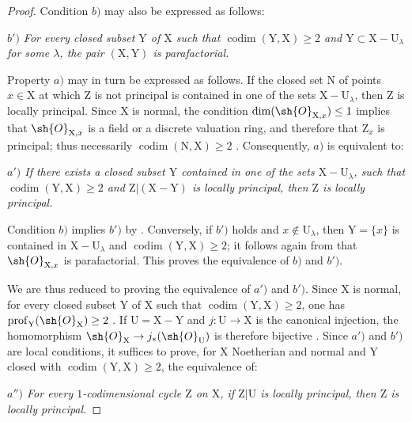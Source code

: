 \begin{proof}
Condition $b)$ may also be expressed as follows:

\emph{$b')$ For every closed subset $\mathrm{Y}$ of $\mathrm{X}$ such that $\operatorname{codim}(\mathrm{Y},\mathrm{X})\geq 2$ and $\mathrm{Y}\subset\mathrm{X}-\mathrm{U}_\lambda$ for some $\lambda$, the pair $(\mathrm{X},\mathrm{Y})$ is parafactorial.}

Property $a)$ may in turn be expressed as follows. If the closed set $\mathrm{N}$ of points $x\in\mathrm{X}$ at which $\mathrm{Z}$ is not principal is contained in one of the sets $\mathrm{X}-\mathrm{U}_\lambda$, then $\mathrm{Z}$ is locally principal. Since $\mathrm{X}$ is normal, the condition $\dim(\sh{O}_{\mathrm{X},x})\leq 1$ implies that $\sh{O}_{\mathrm{X},x}$ is a field or a discrete valuation ring, and therefore that $\mathrm{Z}_x$ is principal; thus necessarily $\operatorname{codim}(\mathrm{N},\mathrm{X})\geq 2$ . Consequently, $a)$ is equivalent to:

\emph{$a')$ If there exists a closed subset $\mathrm{Y}$ contained in one of the sets $\mathrm{X}-\mathrm{U}_\lambda$, such that $\operatorname{codim}(\mathrm{Y},\mathrm{X})\geq 2$ and $\mathrm{Z}|(\mathrm{X}-\mathrm{Y})$ is locally principal, then $\mathrm{Z}$ is locally principal.}

Condition $b)$ implies $b')$ by . Conversely, if $b')$ holds and $x\notin\mathrm{U}_\lambda$, then $\mathrm{Y}=\{x\}$ is contained in $\mathrm{X}-\mathrm{U}_\lambda$ and $\operatorname{codim}(\mathrm{Y},\mathrm{X})\geq 2$; it follows again from  that $\sh{O}_{\mathrm{X},x}$ is parafactorial. This proves the equivalence of $b)$ and $b')$.

We are thus reduced to proving the equivalence of $a')$ and $b')$. Since $\mathrm{X}$ is normal, for every closed subset $\mathrm{Y}$ of $\mathrm{X}$ such that $\operatorname{codim}(\mathrm{Y},\mathrm{X})\geq 2$, one has $\operatorname{prof}_{\mathrm{Y}}(\sh{O}_{\mathrm{X}})\geq 2$ . If $\mathrm{U}=\mathrm{X}-\mathrm{Y}$ and $j:\mathrm{U}\to\mathrm{X}$ is the canonical injection, the homomorphism $\sh{O}_{\mathrm{X}}\to j_*(\sh{O}_{\mathrm{U}})$ is therefore bijective . Since $a')$ and $b')$ are local conditions, it suffices to prove, for $\mathrm{X}$ Noetherian and normal and $\mathrm{Y}$ closed with $\operatorname{codim}(\mathrm{Y},\mathrm{X})\geq 2$, the equivalence of:

\emph{$a'')$ For every $1$-codimensional cycle $\mathrm{Z}$ on $\mathrm{X}$, if $\mathrm{Z}|\mathrm{U}$ is locally principal, then $\mathrm{Z}$ is locally principal.}


\end{proof}
